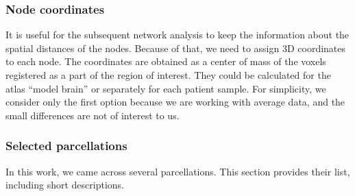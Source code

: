 \subsubsection{Node coordinates}

It is useful for the subsequent network analysis to keep the information about the spatial distances of the nodes. Because of that, we need to assign 3D coordinates to each node. The coordinates are obtained as a center of mass of the voxels registered as a part of the region of interest. They could be calculated for the atlas \enquote{model brain} or separately for each patient sample. For simplicity, we consider only the first option because we are working with average data, and the small differences are not of interest to us.

\subsubsection{Selected parcellations}

In this work, we came across several parcellations. This section provides their list, including short descriptions. 

